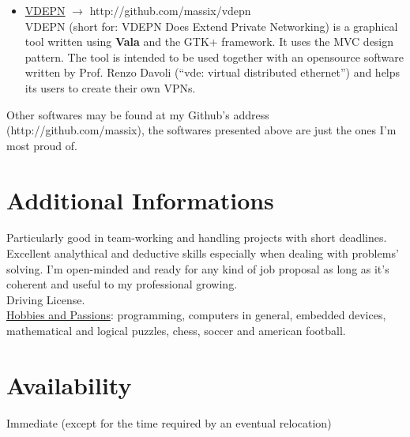 \documentclass[margin]{res}
\begin{document}
\begin{resume}
\begin{itemize}
	\item \underline{VDEPN} $\rightarrow$ http://github.com/massix/vdepn \\
	VDEPN (short for: VDEPN Does Extend Private Networking) is a graphical tool
	written using \textbf{Vala} and the GTK+ framework. It uses the MVC design
	pattern. The tool is intended to be used together with an opensource
	software written by Prof. Renzo Davoli (``vde: virtual distributed
	ethernet'') and helps its users to create their own VPNs.
\end{itemize}

Other softwares may be found at my Github's address (http://github.com/massix),
the softwares presented above are just the ones I'm most proud of.



\section{Additional Informations}
Particularly good in team-working and handling projects with short deadlines.
Excellent analythical and deductive skills especially when dealing with
problems' solving. I'm open-minded and ready for any kind of job proposal as
long as it's coherent and useful to my professional growing. \\
Driving License. \\

\underline{Hobbies and Passions}: programming, computers in general, embedded
devices, mathematical and logical puzzles, chess, soccer and american football.

\section{Availability}
Immediate (except for the time required by an eventual relocation)

\end{resume} 
\end{document}
